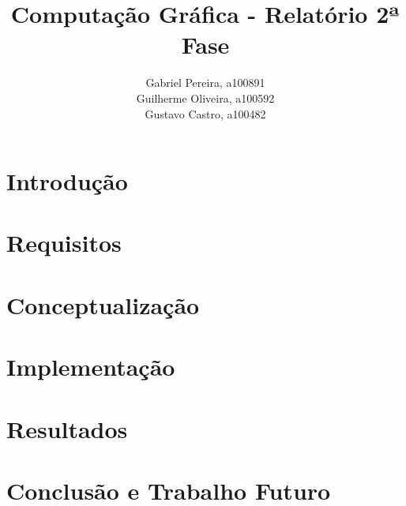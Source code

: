\documentclass[a4paper,12pt]{article}
\title{\textbf{Computação Gráfica - Relatório 2ª Fase}}
\author{Gabriel Pereira, a100891\\
                Guilherme Oliveira, a100592\\
                Gustavo Castro, a100482}
\begin{document}
\begin{titlepage}
        \maketitle
\end{titlepage}


\section{Introdução}


\section{Requisitos}


\section{Conceptualização}


\section{Implementação}


\section{Resultados}


\section{Conclusão e Trabalho Futuro}


\end{document}
